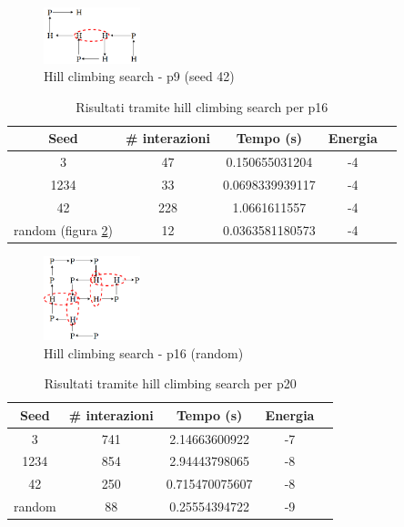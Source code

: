 \documentclass[conference]{IEEEtran}
\begin{document}
\begin{figure}[H]
\centering
\includegraphics[width=0.25\textwidth]{figure/p9LS.png}
\caption{Hill climbing search - p9 (seed 42)}
\label{fig:lsp9}
\end{figure}

\begin{table}[H]
\begin{center}
\begin{tabular}{|c|c|c|c|c|}
\hline
\textbf{Seed} & \textbf{\# interazioni} & \textbf{Tempo (s)} & \textbf{Energia} \\ \hline
3 & 47 & 0.150655031204 & -4 \\ \hline
1234 & 33 & 0.0698339939117 & -4 \\ \hline
42 & 228 & 1.0661611557 & -4 \\ \hline
random (figura \ref{fig:lsp16}) & 12 & 0.0363581180573 & -4 \\ \hline
\end{tabular}
\end{center}
\caption{Risultati tramite hill climbing search per p16}
\end{table}

\begin{figure}[H]
\centering
\includegraphics[width=0.25\textwidth]{figure/LSP16.png}
\caption{Hill climbing search - p16 (random)}
\label{fig:lsp16}
\end{figure}

\begin{table}[H]
\begin{center}
\begin{tabular}{|c|c|c|c|c|}
\hline
\textbf{Seed} & \textbf{\# interazioni} & \textbf{Tempo (s)} & \textbf{Energia} \\ \hline
3 & 741 & 2.14663600922 & -7 \\ \hline
1234 & 854 & 2.94443798065 & -8 \\ \hline
42 & 250 & 0.715470075607 & -8 \\ \hline
random & 88 & 0.25554394722 & -9 \\ \hline
\end{tabular}
\end{center}
\caption{Risultati tramite hill climbing search per p20}
\end{table}
\end{document}
